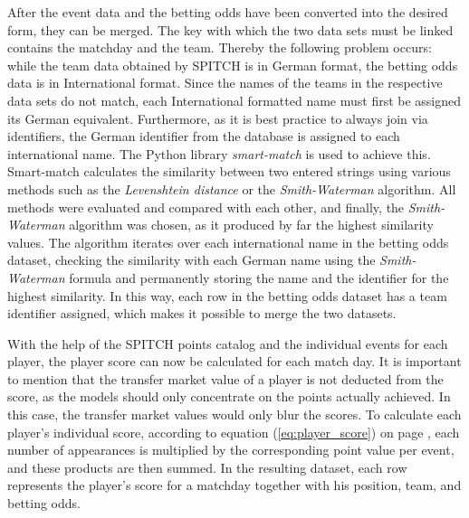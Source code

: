 After the event data and the betting odds have been converted into the desired form, they can be merged. The key with which the two data sets must be linked contains the matchday and the team. Thereby the following problem occurs: while the team data obtained by SPITCH is in German format, the betting odds data is in International format. Since the names of the teams in the respective data sets do not match, each International formatted name must first be assigned its German equivalent. Furthermore, as it is best practice to always join via identifiers, the German identifier from the database is assigned to each international name. The Python library \emph{smart-match} is used to achieve this. Smart-match calculates the similarity between two entered strings using various methods such as the \emph{Levenshtein distance} or the \emph{Smith-Waterman} algorithm. All methods were evaluated and compared with each other, and finally, the \emph{Smith-Waterman} algorithm was chosen, as it produced by far the highest similarity values. The algorithm iterates over each international name in the betting odds dataset, checking the similarity with each German name using the \emph{Smith-Waterman} formula and permanently storing the name and the identifier for the highest similarity. In this way, each row in the betting odds dataset has a team identifier assigned, which makes it possible to merge the two datasets.

With the help of the SPITCH points catalog and the individual events for each player, the player score can now be calculated for each match day. It is important to mention that the transfer market value of a player is not deducted from the score, as the models should only concentrate on the points actually achieved. In this case, the transfer market values would only blur the scores. To calculate each player's individual score, according to equation (\ref{eq:player_score}) on page \pageref{eq:player_score}, each number of appearances is multiplied by the corresponding point value per event, and these products are then summed. In the resulting dataset, each row represents the player's score for a matchday together with his position, team, and betting odds.

